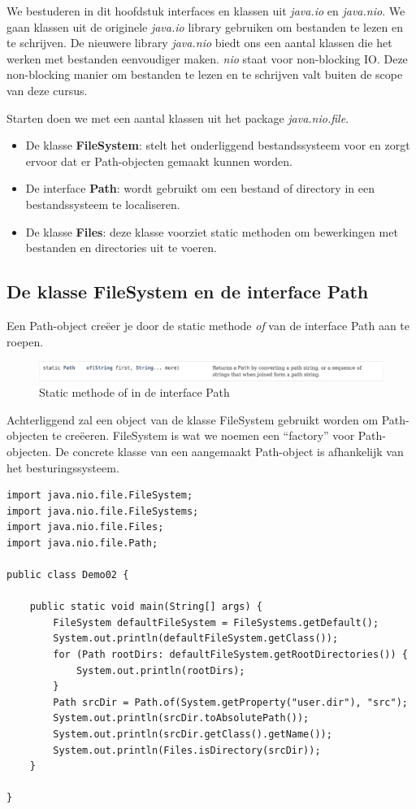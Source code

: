 We bestuderen in dit hoofdstuk interfaces en klassen uit \textit{java.io} en \textit{java.nio}. 
We gaan klassen uit de originele \textit{java.io} library gebruiken om bestanden te lezen en te schrijven. De nieuwere library \textit{java.nio} biedt ons een aantal klassen die het werken met bestanden eenvoudiger maken. \textit{nio} staat voor non-blocking IO. Deze non-blocking manier om bestanden te lezen en te schrijven valt buiten de scope van deze cursus.

Starten doen we met een aantal klassen uit het package \textit{java.nio.file}.

\begin{itemize}
\item De klasse \textbf{FileSystem}: stelt het onderliggend bestandssysteem voor en zorgt ervoor dat er Path-objecten gemaakt kunnen worden.
\item De interface \textbf{Path}: wordt gebruikt om een bestand of directory in een bestandssysteem te localiseren.
\item De klasse \textbf{Files}: deze klasse voorziet static methoden om bewerkingen met bestanden en directories uit te voeren.
\end{itemize}

\subsection{De klasse FileSystem en de interface Path}

Een Path-object cre\"eer je door de static methode \textit{of} van de interface Path aan te roepen. 

\begin{figure}[H]
  \includegraphics[width=\linewidth]{images/h8/path_of.png}
  \caption{Static methode of in de interface Path}
  \label{fig:paths}
\end{figure}

Achterliggend zal een object van de klasse FileSystem gebruikt worden om Path-objecten te cre\"eeren. FileSystem is wat we noemen een ``factory'' voor Path-objecten. De concrete klasse van een aangemaakt Path-object is afhankelijk van het besturingssysteem.

\begin{lstlisting}
import java.nio.file.FileSystem;
import java.nio.file.FileSystems;
import java.nio.file.Files;
import java.nio.file.Path;

public class Demo02 {

	public static void main(String[] args) {
		FileSystem defaultFileSystem = FileSystems.getDefault();
		System.out.println(defaultFileSystem.getClass());
		for (Path rootDirs: defaultFileSystem.getRootDirectories()) {
			System.out.println(rootDirs);
		}
		Path srcDir = Path.of(System.getProperty("user.dir"), "src");
		System.out.println(srcDir.toAbsolutePath());
		System.out.println(srcDir.getClass().getName());
		System.out.println(Files.isDirectory(srcDir));
	}

}
\end{lstlisting}

